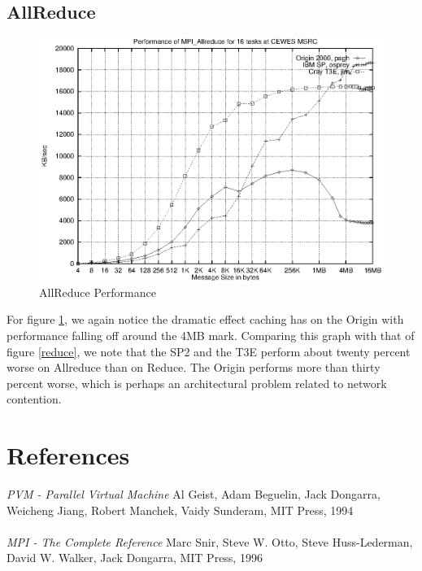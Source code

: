 \documentclass [12pt]{article}
\begin{document}
\subsection{AllReduce}
\begin{figure}[Hht]
\centerline{\includegraphics{pics/cewes_mpi_allreduce.ps}}
\caption{AllReduce Performance}\label{allreduce}
\end{figure}

For figure \ref{allreduce}, we again notice the dramatic effect caching has on the
Origin with performance falling off around the 4MB mark. Comparing this
graph with that of figure \ref{reduce}, we note that the SP2 and the T3E
perform about twenty percent worse on Allreduce than on Reduce. The Origin
performs more than thirty percent worse, which is perhaps an architectural
problem related to network contention. 

\section{References}

{\em PVM - Parallel Virtual Machine} Al Geist, Adam Beguelin, Jack Dongarra, Weicheng Jiang, Robert Manchek, Vaidy Sunderam, MIT Press, 1994 \ \\ \ \\
{\em MPI - The Complete Reference} Marc Snir, Steve W. Otto, Steve Huss-Lederman, David W. Walker, Jack Dongarra, MIT Press, 1996
\end{document}
